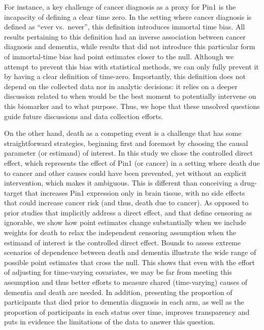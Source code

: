 \documentclass[
]{book}
\begin{document}
For instance, a key challenge of cancer diagnosis as a proxy for Pin1 is the incapacity of defining a clear time zero\autocite{hernan2016}. In the setting where cancer diagnosis is defined as ``ever vs.~never'', this definition introduces immortal time bias. All results pertaining to this definition had an inverse association between cancer diagnosis and dementia, while results that did not introduce this particular form of immortal-time bias had point estimates closer to the null. Although we attempt to prevent this bias with statistical methods, we can only fully prevent it by having a clear definition of time-zero. Importantly, this definition does not depend on the collected data nor in analytic decisions: it relies on a deeper discussion related to when would be the best moment to potentially intervene on this biomarker and to what purpose. Thus, we hope that these unsolved questions guide future discussions and data collection efforts.

On the other hand, death as a competing event is a challenge that has some straightforward strategies, beginning first and foremost by choosing the causal parameter (or estimand) of interest\autocite[\textcite{rojas_medrxiv}]{young2020}. In this study we chose the controlled direct effect, which represents the effect of Pin1 (or cancer) in a setting where death due to cancer and other causes could have been prevented, yet without an explicit intervention, which makes it ambiguous. This is different than conceiving a drug-target that increases Pin1 expression only in brain tissue, with no side effects that could increase cancer risk (and thus, death due to cancer). As opposed to prior studies that implicitly address a direct effect, and that define censoring as ignorable\autocite{frain2017}, we show how point estimates change substantially when we include weights for death to relax the independent censoring assumption\autocite[\textcite{vangeloven2014}, \textcite{willems2018}, \textcite{young2020}]{weuve2012} when the estimand of interest is the controlled direct effect. Bounds to assess extreme scenarios of dependence between death and dementia\autocite{peterson1976} illustrate the wide range of possible point estimates that cross the null. This shows that even with the effort of adjusting for time-varying covariates, we may be far from meeting this assumption and thus better efforts to measure shared (time-varying) causes of dementia and death are needed. In addition, presenting the proportion of participants that died prior to dementia diagnosis in each arm, as well as the proportion of participants in each status over time, improves transparency and puts in evidence the limitations of the data to answer this question.
\end{document}
